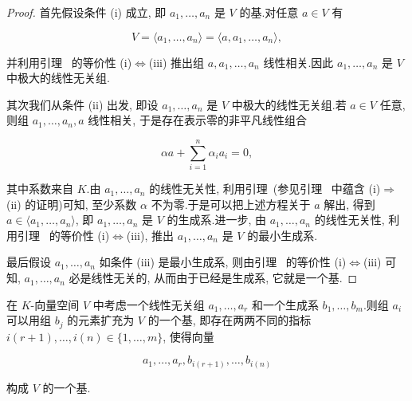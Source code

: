\begin{proof}
首先假设条件 (i) 成立, 即 $a_1, \ldots, a_n$ 是 $V$ 的基.对任意 $a \in V$ 有

\[
V = \langle a_1, \ldots, a_n \rangle = \langle a, a_1, \ldots, a_n \rangle,
\]

并利用引理~ 的等价性 (i)$\Longleftrightarrow$(iii) 推出组 $a, a_1, \ldots, a_n$ 线性相关.因此 $a_1, \ldots, a_n$ 是 $V$ 中极大的线性无关组.

其次我们从条件 (ii) 出发, 即设 $a_1, \ldots, a_n$ 是 $V$ 中极大的线性无关组.若 $a \in V$ 任意, 则组 $a_1, \ldots, a_n, a$ 线性相关, 于是存在表示零的非平凡线性组合

\[
\alpha a + \sum_{i = 1}^{n} \alpha_i a_i = 0,
\]

其中系数来自 $K$.由 $a_1, \ldots, a_n$ 的线性无关性, 利用引理~(参见引理~ 中蕴含 (i)$\Longrightarrow$(ii) 的证明)可知, 至少系数 $\alpha$ 不为零.于是可以把上述方程关于 $a$ 解出, 得到 $a \in \langle a_1, \ldots, a_n \rangle$, 即 $a_1, \ldots, a_n$ 是 $V$ 的生成系.进一步, 由 $a_1, \ldots, a_n$ 的线性无关性, 利用引理~ 的等价性 (i)$\Longleftrightarrow$(iii), 推出 $a_1, \ldots, a_n$ 是 $V$ 的最小生成系.

最后假设 $a_1, \ldots, a_n$ 如条件 (iii) 是最小生成系, 则由引理~ 的等价性 (i)$\Longleftrightarrow$(iii) 可知, $a_1, \ldots, a_n$ 必是线性无关的, 从而由于已经是生成系, 它就是一个基.
\end{proof}

\begin{theorem}\label{thm:1.5.8}
在 $K$-向量空间 $V$ 中考虑一个线性无关组 $a_1, \ldots, a_r$ 和一个生成系 $b_1, \ldots, b_m$.则组 $a_i$ 可以用组 $b_j$ 的元素扩充为 $V$ 的一个基, 即存在两两不同的指标 $i(r + 1), \ldots, i(n) \in \{1, \ldots, m\}$, 使得向量

\[
a_1, \ldots, a_r, b_{i(r + 1)}, \ldots, b_{i(n)}
\]

构成 $V$ 的一个基.
\end{theorem}

